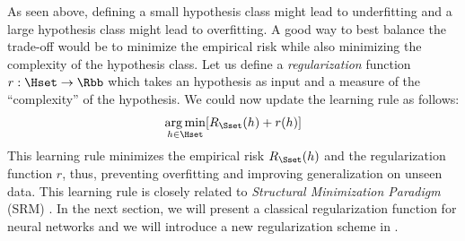 As seen above, defining a small hypothesis class might lead to underfitting and a large hypothesis class might lead to overfitting.
A good way to best balance the trade-off would be to minimize the empirical risk while also minimizing the complexity of the hypothesis class.
Let us define a \emph{regularization} function $r: \Hset \rightarrow \Rbb$ which takes an hypothesis as input and a measure of the ``complexity'' of the hypothesis.
We could now update the learning rule as follows:
\begin{equation}
  \argmin_{h \in \Hset} \left[ R_\Sset(h) + r(h) \right]
\end{equation}
This learning rule minimizes the empirical risk $R_\Sset(h)$ and the regularization function $r$, thus, preventing overfitting and improving generalization on unseen data.
This learning rule is closely related to \emph{Structural Minimization Paradigm} (SRM) \cite{shalev2014understanding}.
In the next section, we will present a classical regularization function for neural networks and we will introduce a new regularization scheme in .













